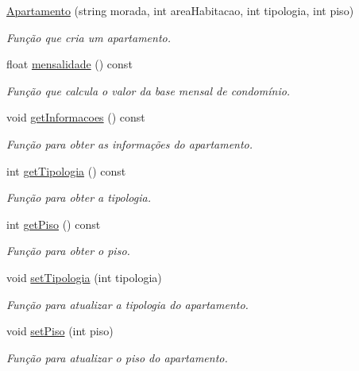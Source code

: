 \begin{DoxyCompactItemize}
\item 
\hyperlink{class_apartamento_ae5b9a8701fd002ea97962d4e7b3ace87}{Apartamento} (string morada, int area\+Habitacao, int tipologia, int piso)
\begin{DoxyCompactList}\small\item\em Função que cria um apartamento. \end{DoxyCompactList}\item 
float \hyperlink{class_apartamento_a3626df5dabd6871c5f9fce39e8c70249}{mensalidade} () const 
\begin{DoxyCompactList}\small\item\em Função que calcula o valor da base mensal de condomínio. \end{DoxyCompactList}\item 
void \hyperlink{class_apartamento_a272ca1ae1ea5b3ea7bc28388b1b79887}{get\+Informacoes} () const 
\begin{DoxyCompactList}\small\item\em Função para obter as informações do apartamento. \end{DoxyCompactList}\item 
int \hyperlink{class_apartamento_a8f933db9b6eb43fc714246e30b4bcf24}{get\+Tipologia} () const 
\begin{DoxyCompactList}\small\item\em Função para obter a tipologia. \end{DoxyCompactList}\item 
int \hyperlink{class_apartamento_a63f2569f807dc98bb632b4830ed18af4}{get\+Piso} () const 
\begin{DoxyCompactList}\small\item\em Função para obter o piso. \end{DoxyCompactList}\item 
void \hyperlink{class_apartamento_a4d66d10fb8c13d78296df641a640a13b}{set\+Tipologia} (int tipologia)
\begin{DoxyCompactList}\small\item\em Função para atualizar a tipologia do apartamento. \end{DoxyCompactList}\item 
void \hyperlink{class_apartamento_af620ef11e65b67939773cf23bc9a2582}{set\+Piso} (int piso)
\begin{DoxyCompactList}\small\item\em Função para atualizar o piso do apartamento. \end{DoxyCompactList}\end{DoxyCompactItemize}


